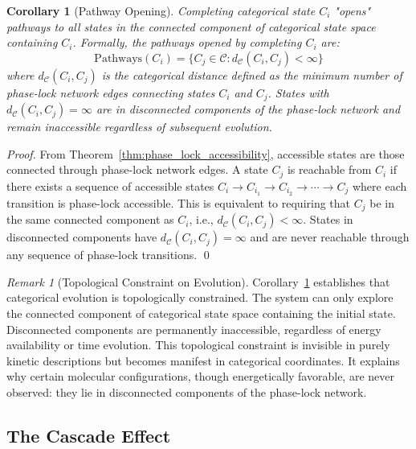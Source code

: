 \documentclass[12pt,a4paper]{article}
\newtheorem{corollary}[theorem]{Corollary}
\theoremstyle{definition}
\theoremstyle{remark}
\newtheorem{remark}[theorem]{Remark}
\newcommand{\catspace}{\mathcal{C}}
\begin{document}
\begin{corollary}[Pathway Opening]
\label{cor:pathway_opening}
Completing categorical state $C_i$ "opens" pathways to all states in the connected component of categorical state space containing $C_i$. Formally, the pathways opened by completing $C_i$ are:
\begin{equation}
\text{Pathways}(C_i) = \{C_j \in \catspace : d_{\catspace}(C_i, C_j) < \infty\}
\end{equation}
where $d_{\catspace}(C_i, C_j)$ is the categorical distance defined as the minimum number of phase-lock network edges connecting states $C_i$ and $C_j$. States with $d_{\catspace}(C_i, C_j) = \infty$ are in disconnected components of the phase-lock network and remain inaccessible regardless of subsequent evolution.
\end{corollary}

\begin{proof}
From Theorem~\ref{thm:phase_lock_accessibility}, accessible states are those connected through phase-lock network edges. A state $C_j$ is reachable from $C_i$ if there exists a sequence of accessible states $C_i \to C_{i_1} \to C_{i_2} \to \cdots \to C_j$ where each transition is phase-lock accessible. This is equivalent to requiring that $C_j$ be in the same connected component as $C_i$, i.e., $d_{\catspace}(C_i, C_j) < \infty$. States in disconnected components have $d_{\catspace}(C_i, C_j) = \infty$ and are never reachable through any sequence of phase-lock transitions. \qed
\end{proof}

\begin{remark}[Topological Constraint on Evolution]
\label{rem:topological_constraint}
Corollary~\ref{cor:pathway_opening} establishes that categorical evolution is topologically constrained. The system can only explore the connected component of categorical state space containing the initial state. Disconnected components are permanently inaccessible, regardless of energy availability or time evolution. This topological constraint is invisible in purely kinetic descriptions but becomes manifest in categorical coordinates. It explains why certain molecular configurations, though energetically favorable, are never observed: they lie in disconnected components of the phase-lock network.
\end{remark}

\subsection{The Cascade Effect}
\end{document}

